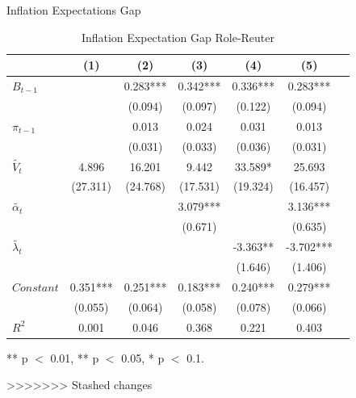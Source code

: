 \documentclass[aspectratio=169,xcolor=dvipsnames]{beamer}
\begin{document}
\begin{frame}{Inflation Expectations Gap}

\begin{table}[!ht]
\small
\centering 
  \caption{Inflation Expectation Gap Role-Reuter} 
  \label{tab:Inflation Expectation Gap Role-Reuter}
\begin{tabular}{l*{6}{c}}   
\toprule
                    & (1) & (2) & (3) & (4) & (5) \\
\midrule
$B_{t-1}$           &     & 0.283*** & 0.342*** & 0.336*** & 0.283*** \\
                    &     & (0.094) & (0.097) & (0.122) & (0.094) \\
$\pi_{t-1}$         &     & 0.013 & 0.024 & 0.031 & 0.013 \\
                    &     & (0.031) & (0.033) & (0.036) & (0.031) \\
$\tilde{V_t}$       & 4.896 & 16.201 & 9.442 & 33.589* & 25.693 \\
                    & (27.311) & (24.768) & (17.531) & (19.324) & (16.457) \\
$\tilde{\alpha_t}$  &     &     & 3.079*** &     & 3.136*** \\
                    &     &     & (0.671) &     & (0.635) \\
$\tilde{\lambda_t}$ &     &     &     & -3.363** & -3.702*** \\
                    &     &     &     & (1.646) & (1.406) \\
$Constant$          & 0.351*** & 0.251*** & 0.183*** & 0.240*** & 0.279*** \\
                    & (0.055) & (0.064) & (0.058) & (0.078) & (0.066) \\
\midrule
$R^2$               & 0.001 & 0.046 & 0.368 & 0.221 & 0.403 \\
\bottomrule
\end{tabular} 
\parbox{0.8\textwidth}{\centering \small *** p $<$ 0.01, ** p $<$ 0.05, * p $<$ 0.1.}
\end{table}

\end{frame}



>>>>>>> Stashed changes
\end{document}
